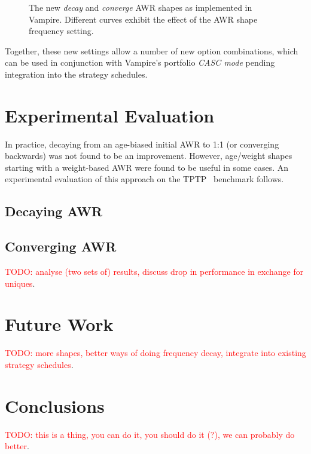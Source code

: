 \documentclass{llncs}
\newcommand{\todo}[1]{\textcolor{red}{TODO: #1}}
\begin{document}
\begin{figure}
	\caption{The new \emph{decay} and \emph{converge} AWR shapes as implemented in Vampire. Different curves exhibit the effect of the AWR shape frequency setting.}
	\label{fig:decay-and-converge}
\end{figure}

Together, these new settings allow a number of new option combinations, which can be used in conjunction with Vampire's portfolio \emph{CASC mode} pending integration into the strategy schedules.

\section{Experimental Evaluation}
In practice, decaying from an age-biased initial AWR to 1:1 (or converging backwards) was not found to be an improvement.
However, age/weight shapes starting with a weight-based AWR were found to be useful in some cases.
An experimental evaluation of this approach on the TPTP~\cite{tptp} benchmark follows.

\subsection{Decaying AWR}
\subsection{Converging AWR}
\todo{analyse (two sets of) results, discuss drop in performance in exchange for uniques}.

\section{Future Work}
\todo{more shapes, better ways of doing frequency decay, integrate into existing strategy schedules}.

\section{Conclusions}
\todo{this is a thing, you can do it, you should do it (?), we can probably do better}.



\end{document}
